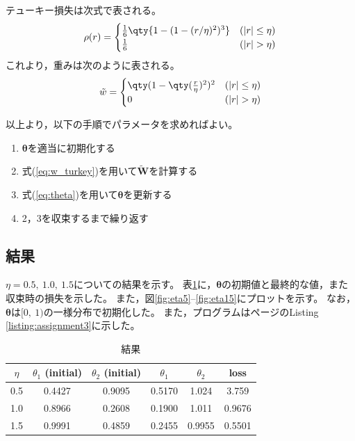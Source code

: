 \documentclass[class=jsarticle, crop=false, dvipdfmx, fleqn]{standalone}
\begin{document}
テューキー損失は次式で表される。
\begin{equation}
    \rho(r) =
        \begin{cases}
            \frac{1}{6} \qty{1 - (1 - (r/\eta)^2)^3} & (|r| \le \eta) \\
            \frac{1}{6} & (|r| > \eta)
        \end{cases}
\end{equation}
これより，重みは次のように表される。
\begin{equation}
    \tilde{w} =
        \begin{cases}
            \qty(1 - \qty(\frac{r}{\eta})^2)^2 & (|r| \le \eta) \\
            0 & (|r| > \eta)
        \end{cases}
    \label{eq:w_turkey}
\end{equation}

以上より，以下の手順でパラメータを求めればよい。
\begin{enumerate}
    \item \(\bm{\theta}\)を適当に初期化する
    \item 式(\ref{eq:w_turkey})を用いて\(\tilde{\bm{W}}\)を計算する
    \item 式(\ref{eq:theta})を用いて\(\bm{\theta}\)を更新する
    \item 2，3を収束するまで繰り返す
\end{enumerate}



\subsection*{結果}

\(\eta = 0.5,\ 1.0,\ 1.5\)についての結果を示す。
表\ref{tab:result}に，\(\bm{\theta}\)の初期値と最終的な値，また収束時の損失を示した。
また，図\ref{fig:eta5}--\ref{fig:eta15}にプロットを示す。
なお，\(\bm{\theta}\)は\([0,\ 1)\)の一様分布で初期化した。
また，プログラムは\pageref{listing:assignment3}ページのListing \ref{listing:assignment3}に示した。

\begin{table}
    \centering
    \caption{結果}
    \begin{tabular}{cccccc}
        \(\eta\) & \(\theta_1\) (initial) & \(\theta_2\) (initial) & \(\theta_1\) & \(\theta_2\) & loss \\ \hline
        0.5 & 0.4427 & 0.9095 & 0.5170 & 1.024 & 3.759 \\
        1.0 & 0.8966 & 0.2608 & 0.1900 & 1.011 & 0.9676 \\
        1.5 & 0.9991 & 0.4859 & 0.2455 & 0.9955 & 0.5501
    \end{tabular}
    \label{tab:result}
\end{table}
\end{document}
